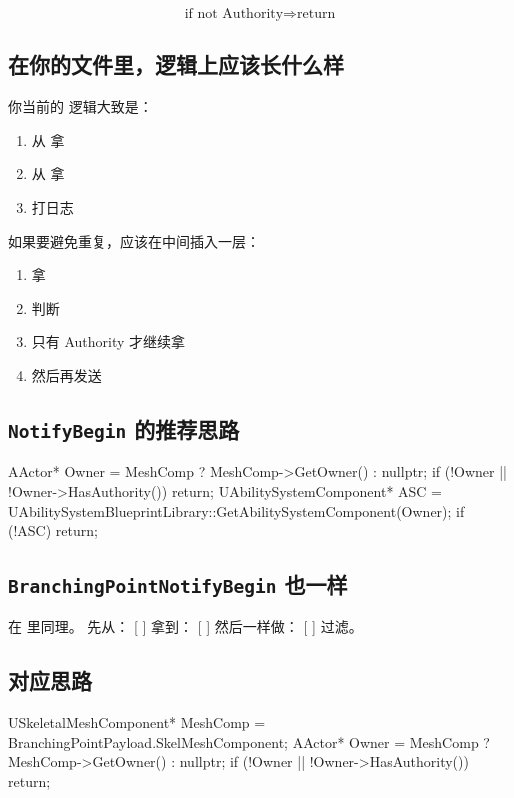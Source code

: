 \[
\text{if not Authority} \Rightarrow \text{return}
\]

\subsection{在你的文件里，逻辑上应该长什么样}

你当前的  逻辑大致是：

\begin{enumerate}
	\item 从  拿 
	\item 从  拿 
	\item 打日志
\end{enumerate}

如果要避免重复，应该在中间插入一层：

\begin{enumerate}
	\item 拿 
	\item 判断 
	\item 只有 Authority 才继续拿 
	\item 然后再发送 
\end{enumerate}

\subsection{\texttt{NotifyBegin} 的推荐思路}

\begin{code}
	AActor* Owner = MeshComp ? MeshComp->GetOwner() : nullptr;
	if (!Owner || !Owner->HasAuthority())
	{
		return;
	}
	UAbilitySystemComponent* ASC =
	UAbilitySystemBlueprintLibrary::GetAbilitySystemComponent(Owner);
	if (!ASC)
	{
		return;
	}
\end{code}

\subsection{\texttt{BranchingPointNotifyBegin} 也一样}
在  里同理。
先从：
[  ]
拿到：
[  ]
然后一样做：
[  ]
过滤。
\subsection{对应思路}
\begin{code}
	USkeletalMeshComponent* MeshComp = BranchingPointPayload.SkelMeshComponent;
	AActor* Owner = MeshComp ? MeshComp->GetOwner() : nullptr;
	if (!Owner || !Owner->HasAuthority())
	{
		return;
	}	
\end{code}
